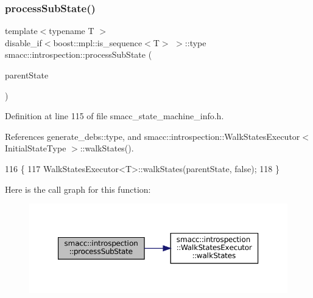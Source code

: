 \subsubsection{\texorpdfstring{process\+Sub\+State()}{processSubState()}\hspace{0.1cm}{\footnotesize\ttfamily [1/2]}}
{\footnotesize\ttfamily template$<$typename T $>$ \\
disable\+\_\+if$<$boost\+::mpl\+::is\+\_\+sequence$<$T$>$ $>$\+::type smacc\+::introspection\+::process\+Sub\+State (\begin{DoxyParamCaption}\item[{std\+::shared\+\_\+ptr$<$ \hyperlink{classsmacc_1_1introspection_1_1SmaccStateInfo}{Smacc\+State\+Info} $>$ \&}]{parent\+State }\end{DoxyParamCaption})}



Definition at line 115 of file smacc\+\_\+state\+\_\+machine\+\_\+info.\+h.



References generate\+\_\+debs\+::type, and smacc\+::introspection\+::\+Walk\+States\+Executor$<$ Initial\+State\+Type $>$\+::walk\+States().


\begin{DoxyCode}
116 \{
117     WalkStatesExecutor<T>::walkStates(parentState, \textcolor{keyword}{false});
118 \}
\end{DoxyCode}
Here is the call graph for this function\+:
\nopagebreak
\begin{figure}[H]
\begin{center}
\leavevmode
\includegraphics[width=350pt]{namespacesmacc_1_1introspection_a2911e2897a4572095bc9e7bc75e3a728_cgraph}
\end{center}
\end{figure}
\mbox{\label{namespacesmacc_1_1introspection_a14818620c2ac312e0622b241dcddceaa}} 
